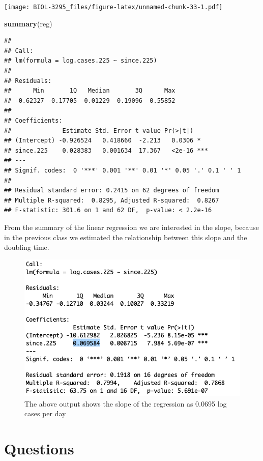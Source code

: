 \documentclass[]{book}
\newenvironment{Shaded}{\begin{snugshade}}{\end{snugshade}}
\newcommand{\KeywordTok}[1]{\textcolor[rgb]{0.13,0.29,0.53}{\textbf{{#1}}}}
\newcommand{\NormalTok}[1]{{#1}}
\begin{document}
\texttt{[image: BIOL-3295\_files/figure-latex/unnamed-chunk-33-1.pdf]}

\begin{Shaded}
\begin{Highlighting}[]
\KeywordTok{summary}\NormalTok{(reg)}
\end{Highlighting}
\end{Shaded}

\begin{verbatim}
## 
## Call:
## lm(formula = log.cases.225 ~ since.225)
## 
## Residuals:
##      Min       1Q   Median       3Q      Max 
## -0.62327 -0.17705 -0.01229  0.19096  0.55852 
## 
## Coefficients:
##              Estimate Std. Error t value Pr(>|t|)    
## (Intercept) -0.926524   0.418660  -2.213   0.0306 *  
## since.225    0.028383   0.001634  17.367   <2e-16 ***
## ---
## Signif. codes:  0 '***' 0.001 '**' 0.01 '*' 0.05 '.' 0.1 ' ' 1
## 
## Residual standard error: 0.2415 on 62 degrees of freedom
## Multiple R-squared:  0.8295, Adjusted R-squared:  0.8267 
## F-statistic: 301.6 on 1 and 62 DF,  p-value: < 2.2e-16
\end{verbatim}

From the summary of the linear regression we are interested in the
slope, because in the previous class we estimated the relationship
between this slope and the doubling time.

\begin{figure}
\includegraphics[width=0.95\linewidth]{figures/regression} \caption{The above output shows the slope of the regression as 0.0695 log cases per day}\label{fig:regression}
\end{figure}

\section{Questions}\label{questions}
\end{document}
